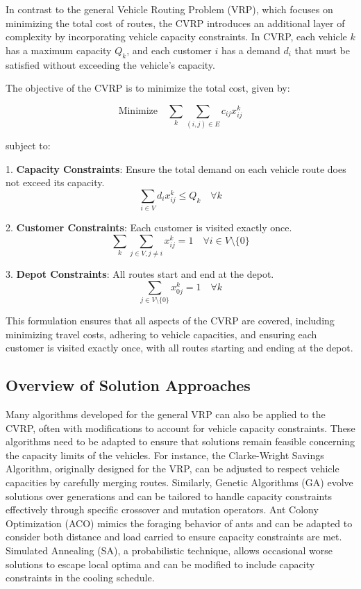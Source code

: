 \documentclass[
]{article}
\begin{document}
In contrast to the general Vehicle Routing Problem (VRP), which focuses on minimizing the total cost of routes, the CVRP introduces an additional layer of complexity by incorporating vehicle capacity constraints. In CVRP, each vehicle $k$ has a maximum capacity $Q_k$, and each customer $i$ has a demand $d_i$ that must be satisfied without exceeding the vehicle's capacity.

The objective of the CVRP is to minimize the total cost, given by:

\begin{equation}
\text{Minimize} \quad \sum_{k} \sum_{(i,j) \in E} c_{ij} x_{ij}^k
\end{equation}

subject to:

1. \textbf{Capacity Constraints}: Ensure the total demand on each vehicle route does not exceed its capacity.
\begin{equation}
\sum_{i \in V} d_i x_{ij}^k \leq Q_k \quad \forall k
\end{equation}

2. \textbf{Customer Constraints}: Each customer is visited exactly once.
\begin{equation}
\sum_{k} \sum_{j \in V, j \neq i} x_{ij}^k = 1 \quad \forall i \in V \setminus \{0\}
\end{equation}

3. \textbf{Depot Constraints}: All routes start and end at the depot.
\begin{equation}
\sum_{j \in V \setminus \{0\}} x_{0j}^k = 1 \quad \forall k
\end{equation}

This formulation ensures that all aspects of the CVRP are covered, including minimizing travel costs, adhering to vehicle capacities, and ensuring each customer is visited exactly once, with all routes starting and ending at the depot.

\subsection{Overview of Solution Approaches}

Many algorithms developed for the general VRP can also be applied to the CVRP, often with modifications to account for vehicle capacity constraints. These algorithms need to be adapted to ensure that solutions remain feasible concerning the capacity limits of the vehicles. For instance, the Clarke-Wright Savings Algorithm, originally designed for the VRP, can be adjusted to respect vehicle capacities by carefully merging routes. Similarly, Genetic Algorithms (GA) evolve solutions over generations and can be tailored to handle capacity constraints effectively through specific crossover and mutation operators. Ant Colony Optimization (ACO) mimics the foraging behavior of ants and can be adapted to consider both distance and load carried to ensure capacity constraints are met. Simulated Annealing (SA), a probabilistic technique, allows occasional worse solutions to escape local optima and can be modified to include capacity constraints in the cooling schedule.
\end{document}
